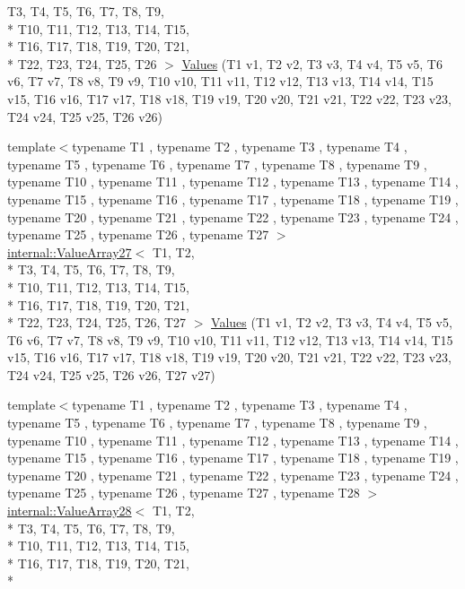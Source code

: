 \begin{DoxyCompactItemize}
T3, T4, T5, T6, T7, T8, T9, \\*
T10, T11, T12, T13, T14, T15, \\*
T16, T17, T18, T19, T20, T21, \\*
T22, T23, T24, T25, T26 $>$ \hyperlink{namespacetesting_aeca27a322529e5bbd6331e40c810a123}{Values} (T1 v1, T2 v2, T3 v3, T4 v4, T5 v5, T6 v6, T7 v7, T8 v8, T9 v9, T10 v10, T11 v11, T12 v12, T13 v13, T14 v14, T15 v15, T16 v16, T17 v17, T18 v18, T19 v19, T20 v20, T21 v21, T22 v22, T23 v23, T24 v24, T25 v25, T26 v26)
\item 
{\footnotesize template$<$typename T1 , typename T2 , typename T3 , typename T4 , typename T5 , typename T6 , typename T7 , typename T8 , typename T9 , typename T10 , typename T11 , typename T12 , typename T13 , typename T14 , typename T15 , typename T16 , typename T17 , typename T18 , typename T19 , typename T20 , typename T21 , typename T22 , typename T23 , typename T24 , typename T25 , typename T26 , typename T27 $>$ }\\\hyperlink{classtesting_1_1internal_1_1_value_array27}{internal\-::\-Value\-Array27}$<$ T1, T2, \\*
T3, T4, T5, T6, T7, T8, T9, \\*
T10, T11, T12, T13, T14, T15, \\*
T16, T17, T18, T19, T20, T21, \\*
T22, T23, T24, T25, T26, T27 $>$ \hyperlink{namespacetesting_a089ea706f6cdde715d03ab42aa3099d3}{Values} (T1 v1, T2 v2, T3 v3, T4 v4, T5 v5, T6 v6, T7 v7, T8 v8, T9 v9, T10 v10, T11 v11, T12 v12, T13 v13, T14 v14, T15 v15, T16 v16, T17 v17, T18 v18, T19 v19, T20 v20, T21 v21, T22 v22, T23 v23, T24 v24, T25 v25, T26 v26, T27 v27)
\item 
{\footnotesize template$<$typename T1 , typename T2 , typename T3 , typename T4 , typename T5 , typename T6 , typename T7 , typename T8 , typename T9 , typename T10 , typename T11 , typename T12 , typename T13 , typename T14 , typename T15 , typename T16 , typename T17 , typename T18 , typename T19 , typename T20 , typename T21 , typename T22 , typename T23 , typename T24 , typename T25 , typename T26 , typename T27 , typename T28 $>$ }\\\hyperlink{classtesting_1_1internal_1_1_value_array28}{internal\-::\-Value\-Array28}$<$ T1, T2, \\*
T3, T4, T5, T6, T7, T8, T9, \\*
T10, T11, T12, T13, T14, T15, \\*
T16, T17, T18, T19, T20, T21, \\*

\end{DoxyCompactItemize}
